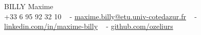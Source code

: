 \begin{center}
{\huge BILLY Maxime}
    \\
    \vspace{2pt}
    {+33 6 95 92 32 10} ~
    \small{-}
    \href{mailto:maxime.billy@etu.univ-cotedazur.fr}{maxime.billy@etu.univ-cotedazur.fr} ~
    \small{-}
    \href{https://www.linkedin.com/in/maxime-billy/}{ linkedin.com/in/maxime-billy}  ~
    \small{-}
    \href{https://github.com/ozeliurs}{ github.com/ozeliurs} ~
    \vspace{-5pt}
\end{center}
